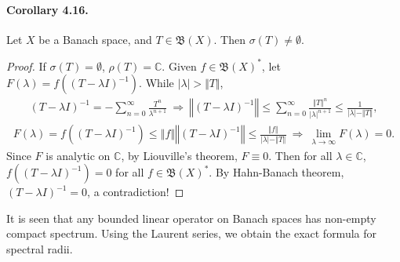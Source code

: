 \documentclass{article}
\begin{document}
\paragraph{Corollary 4.16.\label{cor:4.16}} Let $X$ be a Banach space, and $T\in\mathfrak{B}(X)$. Then $\sigma(T)\neq\emptyset$.
\begin{proof}
If $\sigma(T)=\emptyset$, $\rho(T)=\mathbb{C}$. Given $f\in\mathfrak{B}(X)^*$, let $F(\lambda)=f\left((T-\lambda I)^{-1}\right)$. While $\vert\lambda\vert > \Vert T\Vert$,
\begin{align*}
	(T-\lambda I)^{-1} = -\sum_{n=0}^\infty\frac{T^n}{\lambda^{n+1}}\ \Rightarrow\ \left\Vert(T-\lambda I)^{-1}\right\Vert\leq\sum_{n=0}^\infty\frac{\Vert T\Vert^n}{\vert\lambda\vert^{n+1}}\leq\frac{1}{\vert\lambda\vert - \Vert T\Vert},
\end{align*}
\begin{align*}
	F(\lambda)=f\left((T-\lambda I)^{-1}\right)\leq\left\Vert f\right\Vert\left\Vert(T-\lambda I)^{-1}\right\Vert \leq\frac{\Vert f\Vert}{\vert\lambda\vert - \Vert T\Vert}\ \Rightarrow\ \lim_{\lambda\to\infty} F(\lambda) = 0.
\end{align*}
Since $F$ is analytic on $\mathbb{C}$, by Liouville's theorem, $F\equiv 0$. Then for all $\lambda\in\mathbb{C}$, $f\left((T-\lambda I)^{-1}\right)=0$ for all $f\in\mathfrak{B}(X)^*$. By Hahn-Banach theorem, $\left(T-\lambda I\right)^{-1}=0$, a contradiction!
\end{proof}

It is seen that any bounded linear operator on Banach spaces has non-empty compact spectrum. Using the Laurent series, we obtain the exact formula for spectral radii.
\end{document}
